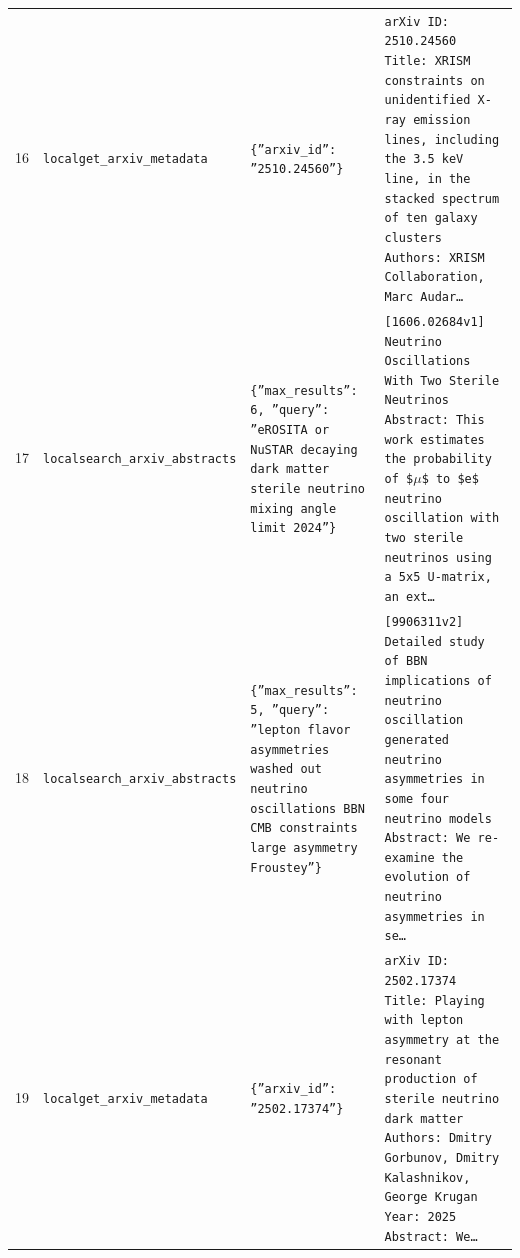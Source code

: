 \documentclass[11pt,a4paper]{article}
\begin{document}
\begin{longtable}{@{}p{}p{}p{}p{}@{}}
16 & \texttt{local}\newline\texttt{get\_\allowbreak{}arxiv\_\allowbreak{}metadata} & \texttt{\{''arxiv\_\allowbreak{}id'':\allowbreak{} ''2510.24560''\}\allowbreak{}} & \texttt{arXiv ID:\allowbreak{} 2510.24560 Title:\allowbreak{} XRISM constraints on unidentified X-ray emission lines,\allowbreak{} including the 3.5 keV line,\allowbreak{} in the stacked spectrum of ten galaxy clusters Authors:\allowbreak{}  XRISM Collaboration,\allowbreak{} Marc Audar\ldots{}\allowbreak{}} \\
17 & \texttt{local}\newline\texttt{search\_\allowbreak{}arxiv\_\allowbreak{}abstracts} & \texttt{\{''max\_\allowbreak{}results'':\allowbreak{} 6,\allowbreak{} ''query'':\allowbreak{} ''eROSITA or NuSTAR decaying dark matter sterile neutrino mixing angle limit 2024''\}\allowbreak{}} & \texttt{[1606.02684v1]\allowbreak{} Neutrino Oscillations With Two Sterile Neutrinos Abstract:\allowbreak{} This work estimates the probability of \$$\mu$\$ to \$e\$ neutrino oscillation with two sterile neutrinos using a 5x5 U-matrix,\allowbreak{} an ext\ldots{}\allowbreak{}} \\
18 & \texttt{local}\newline\texttt{search\_\allowbreak{}arxiv\_\allowbreak{}abstracts} & \texttt{\{''max\_\allowbreak{}results'':\allowbreak{} 5,\allowbreak{} ''query'':\allowbreak{} ''lepton flavor asymmetries washed out neutrino oscillations BBN CMB constraints large asymmetry Froustey''\}\allowbreak{}} & \texttt{[9906311v2]\allowbreak{} Detailed study of BBN implications of neutrino oscillation generated neutrino asymmetries in some four neutrino models Abstract:\allowbreak{}   We re-examine the evolution of neutrino asymmetries in se\ldots{}\allowbreak{}} \\
19 & \texttt{local}\newline\texttt{get\_\allowbreak{}arxiv\_\allowbreak{}metadata} & \texttt{\{''arxiv\_\allowbreak{}id'':\allowbreak{} ''2502.17374''\}\allowbreak{}} & \texttt{arXiv ID:\allowbreak{} 2502.17374 Title:\allowbreak{} Playing with lepton asymmetry at the resonant production of sterile neutrino dark matter Authors:\allowbreak{} Dmitry Gorbunov,\allowbreak{} Dmitry Kalashnikov,\allowbreak{} George Krugan Year:\allowbreak{} 2025 Abstract:\allowbreak{} We\ldots{}\allowbreak{}} \\

\end{longtable}
\end{document}

